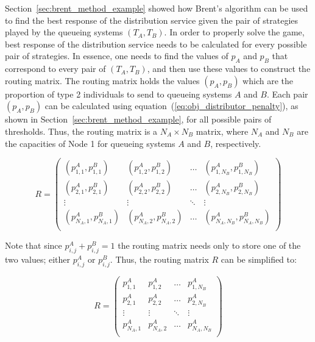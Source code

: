 Section~\ref{sec:brent_method_example} showed how Brent's algorithm can be used to
find the best response of the distribution service given the pair of strategies
played by the queueing systems \((T_A, T_B)\).
In order to properly solve the game, best response of the distribution service
needs to be calculated for every possible pair of strategies.
In essence, one needs to find the values of \(p_A\) and \(p_B\) that correspond
to every pair of \((T_A, T_B)\), and then use these values to construct the
routing matrix.
The routing matrix holds the values \((p_A, p_B)\) which are the proportion
of type 2 individuals to send to queueing systems \(A\) and \(B\).
Each pair \((p_A, p_B)\) can be calculated using
equation~(\ref{eq:obj_distributor_penalty}), as shown in
Section~\ref{sec:brent_method_example}, for all possible pairs of thresholds.
Thus, the routing matrix is a \(N_A \times N_B\) matrix, where \(N_A\) and
\(N_B\) are the capacities of Node 1 for queueing systems \(A\) and \(B\),
respectively.

\begin{equation}\label{eq:routing_matrix}
    R =
    \begin{pmatrix}
        (p_{1,1}^A, p_{1,1}^B) & (p_{1,2}^A, p_{1,2}^B) & \dots &
        (p_{1,N_B}^A, p_{1,N_B}^B) \\
        (p_{2,1}^A, p_{2,1}^B) & (p_{2,2}^A, p_{2,2}^B) & \dots &
        (p_{2,N_B}^A, p_{2,N_B}^B) \\
        \vdots & \vdots & \ddots & \vdots \\
        (p_{N_A,1}^A, p_{N_A,1}^B) & (p_{N_A,2}^A, p_{N_A,2}^B) & \dots &
        (p_{N_A,N_B}^A, p_{N_A,N_B}^B) \\
    \end{pmatrix}
\end{equation}

Note that since \(p_{i,j}^A + p_{i,j}^B = 1\) the routing matrix needs only to
store one of the two values; either \(p_{i,j}^A\) or \(p_{i,j}^B\).
Thus, the routing matrix \(R\) can be simplified to:

\begin{equation}\label{eq:routing_matrix_simplified}
    R =
    \begin{pmatrix}
        p_{1,1}^A & p_{1,2}^A & \dots & p_{1,N_B}^A \\
        p_{2,1}^A & p_{2,2}^A & \dots & p_{2,N_B}^A \\
        \vdots & \vdots & \ddots & \vdots \\
        p_{N_A,1}^A & p_{N_A,2}^A & \dots & p_{N_A,N_B}^A \\
    \end{pmatrix}
\end{equation}


